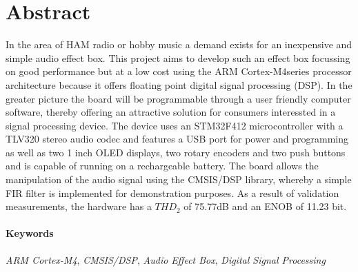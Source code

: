 \section*{Abstract}
\label{sec:Abstract}


In the area of HAM radio or hobby music a demand exists for an inexpensive and simple audio effect box.
This project aims to develop such an effect box focussing on good performance but at a low cost using the ARM Cortex-M4\texttrademark series processor architecture because it offers floating point digital signal processing (DSP).
In the greater picture the board will be programmable through a user friendly computer software, thereby offering an attractive solution for consumers interessted in a signal processing device.
The device uses an STM32F412 microcontroller with a TLV320 stereo audio codec and features a USB port for power and programming as well as two 1 inch OLED displays, two rotary encoders and two push buttons and is capable of running on a rechargeable battery.
The board allows the manipulation of the audio signal using the CMSIS/DSP library, whereby a simple FIR filter is implemented for demonstration purposes.
As a result of validation measurements, the hardware has a $THD_2$ of 75.77dB and an ENOB of 11.23 bit.


\paragraph{Keywords}

\textit{ARM Cortex-M4}, \textit{CMSIS/DSP}, \textit{Audio Effect Box}, \textit{Digital Signal Processing}


